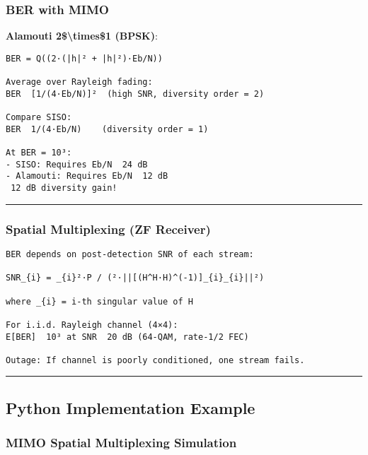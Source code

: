 \subsubsection{BER with MIMO}\label{ber-with-mimo}

\textbf{Alamouti 2\$\textbackslash times\$1 (BPSK)}:

\begin{verbatim}
BER = Q((2·(|h|² + |h|²)·Eb/N))

Average over Rayleigh fading:
BER  [1/(4·Eb/N)]²  (high SNR, diversity order = 2)

Compare SISO:
BER  1/(4·Eb/N)    (diversity order = 1)

At BER = 10³:
- SISO: Requires Eb/N  24 dB
- Alamouti: Requires Eb/N  12 dB
 12 dB diversity gain!
\end{verbatim}

\begin{center}\rule{0.5\linewidth}{0.5pt}\end{center}

\subsubsection{Spatial Multiplexing (ZF
Receiver)}\label{spatial-multiplexing-zf-receiver}

\begin{verbatim}
BER depends on post-detection SNR of each stream:

SNR_{i} = _{i}²·P / (²·||[(H^H·H)^(-1)]_{i}_{i}||²)

where _{i} = i-th singular value of H

For i.i.d. Rayleigh channel (4×4):
E[BER]  10³ at SNR  20 dB (64-QAM, rate-1/2 FEC)

Outage: If channel is poorly conditioned, one stream fails.
\end{verbatim}

\begin{center}\rule{0.5\linewidth}{0.5pt}\end{center}

\subsection{\texorpdfstring{ Python Implementation
Example}{ Python Implementation Example}}\label{python-implementation-example}

\subsubsection{MIMO Spatial Multiplexing
Simulation}\label{mimo-spatial-multiplexing-simulation}

